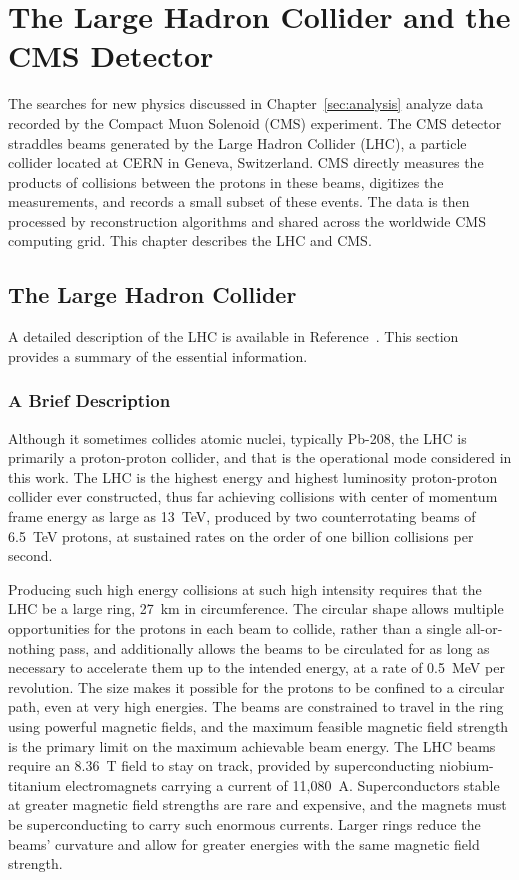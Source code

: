 \chapter{The Large Hadron Collider and the CMS Detector}

The searches for new physics discussed in Chapter~\ref{sec:analysis} analyze data recorded by the Compact Muon Solenoid (CMS) experiment.
The CMS detector straddles beams generated by the Large Hadron Collider (LHC), a particle collider located at CERN in Geneva, Switzerland.
CMS directly measures the products of collisions between the protons in these beams, digitizes the measurements, and records a small subset of these events.
The data is then processed by reconstruction algorithms and shared across the worldwide CMS computing grid.
This chapter describes the LHC and CMS.

\section{The Large Hadron Collider} \label{sec:LHC}

A detailed description of the LHC is available in Reference~\cite{LHC_TDR}.
This section provides a summary of the essential information.

  \subsection{A Brief Description} \label{sec:LHCdescription}

  Although it sometimes collides atomic nuclei, typically Pb-208, the LHC is primarily a proton-proton collider, and that is the operational mode considered in this work.
  The LHC is the highest energy and highest luminosity proton-proton collider ever constructed, thus far achieving collisions with center of momentum frame energy as large as 13~TeV, produced by two counterrotating beams of 6.5~TeV protons, at sustained rates on the order of one billion collisions per second.

  Producing such high energy collisions at such high intensity requires that the LHC be a large ring, 27~km in circumference.
  The circular shape allows multiple opportunities for the protons in each beam to collide, rather than a single all-or-nothing pass, and additionally allows the beams to be circulated for as long as necessary to accelerate them up to the intended energy, at a rate of 0.5~MeV per revolution.
  The size makes it possible for the protons to be confined to a circular path, even at very high energies.
  The beams are constrained to travel in the ring using powerful magnetic fields, and the maximum feasible magnetic field strength is the primary limit on the maximum achievable beam energy.
  The LHC beams require an 8.36~T field to stay on track, provided by superconducting niobium-titanium electromagnets carrying a current of 11,080~A.
  Superconductors stable at greater magnetic field strengths are rare and expensive, and the magnets must be superconducting to carry such enormous currents.
  Larger rings reduce the beams' curvature and allow for greater energies with the same magnetic field strength.

